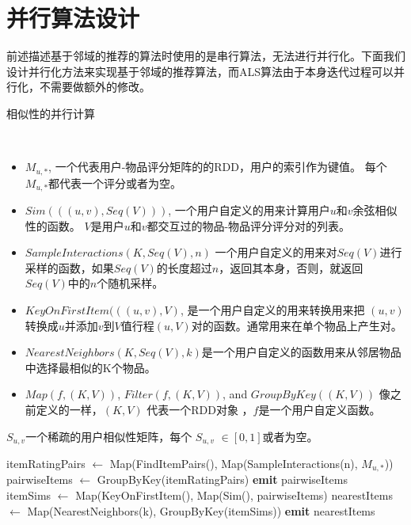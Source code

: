 \section{并行算法设计}
前述描述基于邻域的推荐的算法时使用的是串行算法，无法进行并行化。下面我们设计并行化方法来实现基于邻域的推荐算法，而ALS算法由于本身迭代过程可以并行化，不需要做额外的修改。
    \begin{algorithm}
        \caption{相似性的并行计算}
        \begin{algorithmic}[1] %
            \Require \\
            \begin{itemize} 
                \item $M_{u, *}$, 一个代表用户-物品评分矩阵的的RDD，用户的索引作为键值。 每个$M_{u,*}$都代表一个评分或者为空。
                \item $Sim(((u, v), Seq(V)))$, 一个用户自定义的用来计算用户$u$和$v$余弦相似性的函数。 $V$是用户$u$和$v$都交互过的物品-物品评分评分对的列表。
                \item $SampleInteractions(K, Seq(V), n)$ 一个用户自定义的用来对$Seq(V)$进行采样的函数，如果$Seq(V)$的长度超过$n$，返回其本身，否则，就返回$Seq(V)$中的$n$个随机采样。
                \item $KeyOnFirstItem(((u, v), V)$, 是一个用户自定义的用来转换用来把 $(u, v)$转换成$u$并添加$v$到$V$值行程$(u, V)$对的函数。通常用来在单个物品上产生对。
                \item $NearestNeighbors(K, Seq(V), k)$是一个用户自定义的函数用来从邻居物品中选择最相似的K个物品。
                \item $Map(f, (K, V))$, $Filter(f, (K, V))$, and $GroupByKey((K, V))$ 像之前定义的一样，$(K, V)$ 代表一个RDD对象 ，$f$是一个用户自定义函数。
           \end{itemize}
            \Ensure $S_{u,v}$一个稀疏的用户相似性矩阵，每个 $S_{u, v}$ $\in [0, 1]$或者为空。

            \State itemRatingPairs $\leftarrow$ Map(FindItemPairs(), Map(SampleInteractions(n), $M_{u, *}$))
            \State pairwiseItems $\leftarrow$ GroupByKey(itemRatingPairs)
            \State \textbf{emit} pairwiseItems
            \EndFunction
            \\
                \State itemSims $\leftarrow$ Map(KeyOnFirstItem(), Map(Sim(), pairwiseItems)
                \State nearestItems $\leftarrow$ Map(NearestNeighbors(k), GroupByKey(itemSims))
                \State \textbf{emit} nearestItems
            \EndFunction
        \end{algorithmic}
    \end{algorithm}
    
